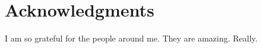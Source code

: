 
\begingroup
\let\clearpage\relax
\let\cleardoublepage\relax
\let\cleardoublepage\relax

\chapter*{Acknowledgments}
I am so grateful for the people around me. They are amazing. Really.

\endgroup